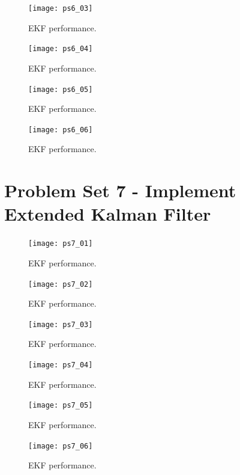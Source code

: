 \documentclass[12pt, letterpaper]{article}
\begin{document}
\begin{figure}[H]
	\centering
	\texttt{[image: ps6\_03]}
	\caption{EKF performance.}
	\label{6:ekf}
\end{figure}


\begin{figure}[H]
	\centering
	\texttt{[image: ps6\_04]}
	\caption{EKF performance.}
	\label{6:ekf}
\end{figure}


\begin{figure}[H]
	\centering
	\texttt{[image: ps6\_05]}
	\caption{EKF performance.}
	\label{6:ekf}
\end{figure}


\begin{figure}[H]
	\centering
	\texttt{[image: ps6\_06]}
	\caption{EKF performance.}
	\label{6:ekf}
\end{figure}




\section{Problem Set 7 - Implement Extended Kalman Filter}



\begin{figure}[H]
	\centering
	\texttt{[image: ps7\_01]}
	\caption{EKF performance.}
	\label{7:ekf}
\end{figure}


\begin{figure}[H]
	\centering
	\texttt{[image: ps7\_02]}
	\caption{EKF performance.}
	\label{7:ekf}
\end{figure}


\begin{figure}[H]
	\centering
	\texttt{[image: ps7\_03]}
	\caption{EKF performance.}
	\label{7:ekf}
\end{figure}


\begin{figure}[H]
	\centering
	\texttt{[image: ps7\_04]}
	\caption{EKF performance.}
	\label{7:ekf}
\end{figure}


\begin{figure}[H]
	\centering
	\texttt{[image: ps7\_05]}
	\caption{EKF performance.}
	\label{7:ekf}
\end{figure}


\begin{figure}[H]
	\centering
	\texttt{[image: ps7\_06]}
	\caption{EKF performance.}
	\label{7:ekf}
\end{figure}
\end{document}
